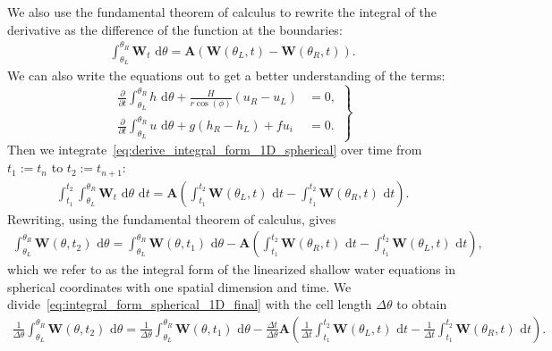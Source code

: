 We also use the fundamental theorem of calculus to rewrite the integral of the derivative as the difference of the function at the boundaries:
\begin{align}\label{eq:derive_integral_form_1D_spherical}
    \int_{\theta_L}^{\theta_R} \mathbf{W}_t \text{ d}\theta =  \mathbf{A} \left( \mathbf{W}(\theta_L, t) - \mathbf{W}(\theta_R, t) \right).
\end{align}
We can also write the equations out to get a better understanding of the terms:
\begin{equation}\label{eq:integral_form_spherical_1D}
    \left.
    \begin{aligned}
        \frac{\partial}{\partial t} \int_{\theta_L}^{\theta_R} h \text{ d}\theta + \frac{H}{r \cos(\phi)} (u_R - u_L) &= 0, \\
        \frac{\partial}{\partial t} \int_{\theta_L}^{\theta_R} u \text{ d}\theta + g(h_R - h_L) + fu_i &= 0.
    \end{aligned}
    \right\}
\end{equation}
Then we integrate~\eqref{eq:derive_integral_form_1D_spherical} over time from $t_1 := t_n$ to $t_2 := t_{n+1}$:
\begin{align*}
    \int_{t_1}^{t_2} \int_{\theta_L}^{\theta_R} \mathbf{W}_t \text{ d}\theta \text{ d}t = \mathbf{A} \left( \int_{t_1}^{t_2} \mathbf{W}(\theta_L, t) \text{ d}t - \int_{t_1}^{t_2} \mathbf{W}(\theta_R, t) \text{ d}t \right).
\end{align*}
Rewriting, using the fundamental theorem of calculus, gives
\begin{align}\label{eq:integral_form_spherical_1D_final}
    \int_{\theta_L}^{\theta_R} \mathbf{W}(\theta, t_2) \text{ d}\theta = \int_{\theta_L}^{\theta_R} \mathbf{W}(\theta, t_1) \text{ d}\theta
    - \mathbf{A} \left( \int_{t_1}^{t_2} \mathbf{W}(\theta_R, t) \text{ d}t - \int_{t_1}^{t_2} \mathbf{W}(\theta_L, t) \text{ d}t \right),
\end{align}
which we refer to as the integral form of the linearized shallow water equations in spherical coordinates with one spatial dimension and time.
We divide~\eqref{eq:integral_form_spherical_1D_final} with the cell length $\Delta \theta$ to obtain
\begin{align}
    \frac{1}{\Delta \theta} \int_{\theta_L}^{\theta_R} \mathbf{W}(\theta, t_2) \text{ d}\theta =
    \frac{1}{\Delta \theta} \int_{\theta_L}^{\theta_R} \mathbf{W}(\theta, t_1) \text{ d}\theta
    - \frac{\Delta t}{\Delta \theta} \mathbf{A} \left( \frac{1}{\Delta t} \int_{t_1}^{t_2} \mathbf{W}(\theta_L, t) \text{ d}t - \frac{1}{\Delta t} \int_{t_1}^{t_2} \mathbf{W}(\theta_R, t) \text{ d}t\right) .
\end{align}
